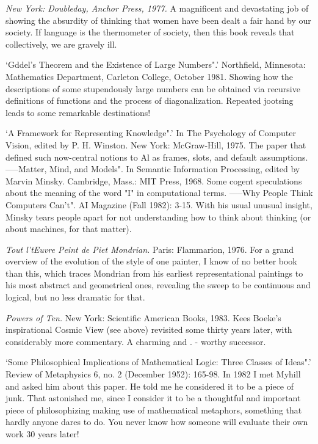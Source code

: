  {\sl New York: Doubleday, Anchor Press, 1977.} A magnificent and devastating job of showing the absurdity of thinking that women have been dealt a fair hand by our society. If language is the thermometer of society, then this book reveals that collectively, we are gravely ill.

 `Gddel's Theorem and the Existence of Large Numbers".' Northfield, Minnesota: Mathematics Department, Carleton College, October 1981. Showing how the descriptions of some stupendously large numbers can be obtained via recursive definitions of functions and the process of diagonalization. Repeated jootsing leads to some remarkable destinations!

 `A Framework for Representing Knowledge".' In The Psychology of Computer Vision, edited by P. H. Winston. New York: McGraw-Hill, 1975. The paper that defined such now-central notions to Al as frames, slots, and default assumptions. -----Matter, Mind, and Models". In Semantic Information Processing, edited by Marvin Minsky. Cambridge, Mass.: MIT Press, 1968. Some cogent speculations about the meaning of the word "I" in computational terms. -----Why People Think Computers Can't". AI Magazine (Fall 1982): 3-15. With his usual unusual insight, Minsky tears people apart for not understanding how to think about thinking (or about machines, for that matter).

 {\sl Tout l'tEuvre Peint de Piet Mondrian.} Paris: Flammarion, 1976. For a grand overview of the evolution of the style of one painter, I know of no better book than this, which traces Mondrian from his earliest representational paintings to his most abstract and geometrical ones, revealing the sweep to be continuous and logical, but no less dramatic for that.

 {\sl Powers of Ten.} New York: Scientific American Books, 1983. Kees Boeke's inspirational Cosmic View (see above) revisited some thirty years later, with considerably more commentary. A charming and . - worthy successor.

 `Some Philosophical Implications of Mathematical Logic: Three Classes of Ideas".' Review of Metaphysics 6, no. 2 (December 1952): 165-98. In 1982 I met Myhill and asked him about this paper. He told me he considered it to be a piece of junk. That astonished me, since I consider it to be a thoughtful and important piece of philosophizing making use of mathematical metaphors, something that hardly anyone dares to do. You never know how someone will evaluate their own work 30 years later!


